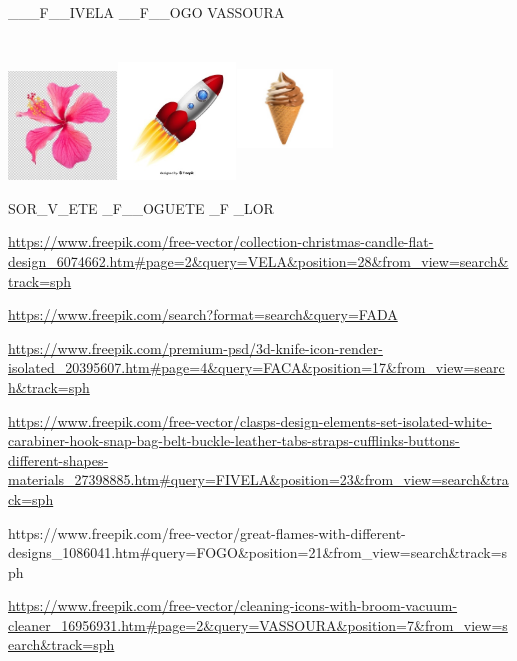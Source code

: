 {\_\_\_F\_\_IVELA \_\_F\_\_OGO VASSOURA

\includegraphics[width=1.13542in,height=1.13542in]{media/image13.jpeg}\includegraphics[width=1.24653in,height=1.22917in]{media/image14.jpeg}\includegraphics[width=1.00000in,height=1.49583in]{media/image15.jpeg}

SOR\_V\_ETE \_F\_\_OGUETE \_F \_LOR

\url{https://www.freepik.com/free-vector/collection-christmas-candle-flat-design_6074662.htm\#page=2\&query=VELA\&position=28\&from_view=search\&track=sph}

\url{https://www.freepik.com/search?format=search\&query=FADA}

\url{https://www.freepik.com/premium-psd/3d-knife-icon-render-isolated_20395607.htm\#page=4\&query=FACA\&position=17\&from_view=search\&track=sph}

\url{https://www.freepik.com/free-vector/clasps-design-elements-set-isolated-white-carabiner-hook-snap-bag-belt-buckle-leather-tabs-straps-cufflinks-buttons-different-shapes-materials_27398885.htm\#query=FIVELA\&position=23\&from_view=search\&track=sph}

https://www.freepik.com/free-vector/great-flames-with-different-designs\_1086041.htm\#query=FOGO\&position=21\&from\_view=search\&track=sph

\url{https://www.freepik.com/free-vector/cleaning-icons-with-broom-vacuum-cleaner_16956931.htm\#page=2\&query=VASSOURA\&position=7\&from_view=search\&track=sph}

}
